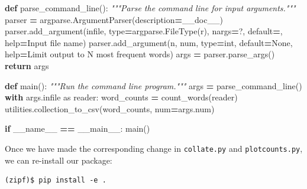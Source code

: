 \documentclass[
]{krantz}
\makeatletter
\newenvironment{Shaded}{\begin{snugshade}}{\end{snugshade}}
\newcommand{\BuiltInTok}[1]{#1}
\newcommand{\CommentTok}[1]{\textcolor[rgb]{0.56,0.35,0.01}{\textit{#1}}}
\newcommand{\ControlFlowTok}[1]{\textcolor[rgb]{0.13,0.29,0.53}{\textbf{#1}}}
\newcommand{\ImportTok}[1]{#1}
\newcommand{\KeywordTok}[1]{\textcolor[rgb]{0.13,0.29,0.53}{\textbf{#1}}}
\newcommand{\NormalTok}[1]{#1}
\newcommand{\OperatorTok}[1]{\textcolor[rgb]{0.81,0.36,0.00}{\textbf{#1}}}
\newcommand{\StringTok}[1]{\textcolor[rgb]{0.31,0.60,0.02}{#1}}
\newcommand{\VariableTok}[1]{\textcolor[rgb]{0.00,0.00,0.00}{#1}}
\newenvironment{kframe}{%
\medskip{}
\setlength{\fboxsep}{.8em}
 \def\at@end@of@kframe{}%
 \ifinner\ifhmode%
  \def\at@end@of@kframe{\end{minipage}}%
  \begin{minipage}{\columnwidth}%
 \fi\fi%
 \def\FrameCommand##1{\hskip\@totalleftmargin \hskip-\fboxsep
 \colorbox{shadecolor}{##1}\hskip-\fboxsep
     \hskip-\linewidth \hskip-\@totalleftmargin \hskip\columnwidth}%
 \MakeFramed {\advance\hsize-\width
   \@totalleftmargin\z@ \linewidth\hsize
   \@setminipage}}%
 {\par\unskip\endMakeFramed%
 \at@end@of@kframe}
\renewenvironment{Shaded}{\begin{kframe}}{\end{kframe}}
\makeatother
\begin{document}
\begin{Shaded}
\begin{Highlighting}[]
\KeywordTok{def}\NormalTok{ parse\_command\_line():}
    \CommentTok{"""Parse the command line for input arguments."""}
\NormalTok{    parser }\OperatorTok{=}\NormalTok{ argparse.ArgumentParser(description}\OperatorTok{=}\NormalTok{\_\_doc\_\_)}
\NormalTok{    parser.add\_argument(}\StringTok{\textquotesingle{}infile\textquotesingle{}}\NormalTok{, }\BuiltInTok{type}\OperatorTok{=}\NormalTok{argparse.FileType(}\StringTok{\textquotesingle{}r\textquotesingle{}}\NormalTok{), nargs}\OperatorTok{=}\StringTok{\textquotesingle{}?\textquotesingle{}}\NormalTok{,}
\NormalTok{                        default}\OperatorTok{=}\StringTok{\textquotesingle{}{-}\textquotesingle{}}\NormalTok{, }\BuiltInTok{help}\OperatorTok{=}\StringTok{\textquotesingle{}Input file name\textquotesingle{}}\NormalTok{)}
\NormalTok{    parser.add\_argument(}\StringTok{\textquotesingle{}{-}n\textquotesingle{}}\NormalTok{, }\StringTok{\textquotesingle{}{-}{-}num\textquotesingle{}}\NormalTok{, }\BuiltInTok{type}\OperatorTok{=}\BuiltInTok{int}\NormalTok{, default}\OperatorTok{=}\VariableTok{None}\NormalTok{,}
                        \BuiltInTok{help}\OperatorTok{=}\StringTok{\textquotesingle{}Limit output to N most frequent words\textquotesingle{}}\NormalTok{)}
\NormalTok{    args }\OperatorTok{=}\NormalTok{ parser.parse\_args()}
    \ControlFlowTok{return}\NormalTok{ args}

\KeywordTok{def}\NormalTok{ main():}
    \CommentTok{"""Run the command line program."""}
\NormalTok{    args }\OperatorTok{=}\NormalTok{ parse\_command\_line()}
    \ControlFlowTok{with}\NormalTok{ args.infile }\ImportTok{as}\NormalTok{ reader:}
\NormalTok{        word\_counts }\OperatorTok{=}\NormalTok{ count\_words(reader)}
\NormalTok{    utilities.collection\_to\_csv(word\_counts, num}\OperatorTok{=}\NormalTok{args.num)}

\ControlFlowTok{if} \VariableTok{\_\_name\_\_} \OperatorTok{==} \StringTok{\textquotesingle{}\_\_main\_\_\textquotesingle{}}\NormalTok{:}
\NormalTok{    main()}
\end{Highlighting}
\end{Shaded}

Once we have made the corresponding change in \texttt{collate.py} and \texttt{plotcounts.py},
we can re-install our package:

\begin{verbatim}
(zipf)$ pip install -e .
\end{verbatim}
\end{document}
